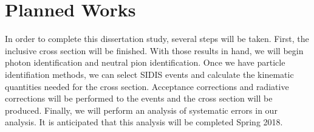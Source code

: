 \section{Planned Works}

In order to complete this dissertation study, several steps will be taken.  First, the inclusive cross section will be finished.  With those results in hand, we will begin photon identification and neutral pion identification.  Once we have particle identifiation methods, we can select SIDIS events and calculate the kinematic quantities needed for the cross section.  Acceptance corrections and radiative corrections will be performed to the events and the cross section will be produced.  Finally, we will perform an analysis of systematic errors in our analysis.  It is anticipated that this analysis will be completed Spring 2018.
